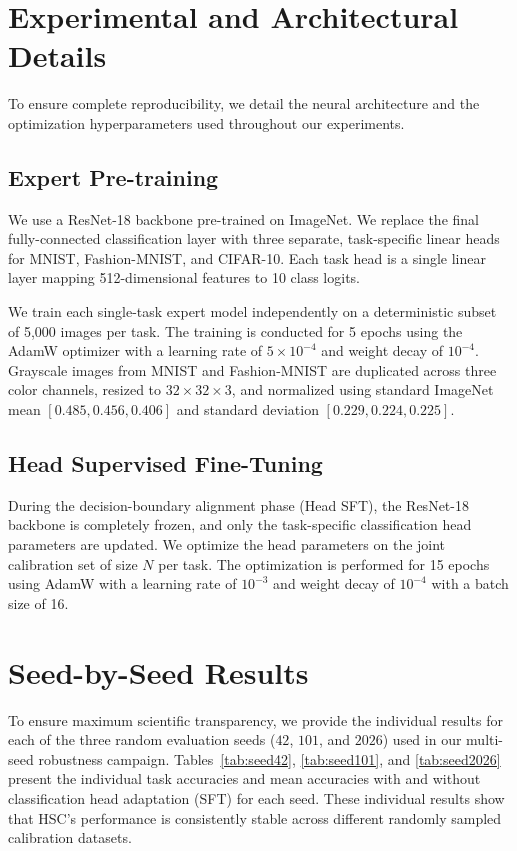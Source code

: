 \documentclass{article}
\begin{document}
\section{Experimental and Architectural Details}
\label{sec:appendix_setup}

To ensure complete reproducibility, we detail the neural architecture and the optimization hyperparameters used throughout our experiments.

\subsection{Expert Pre-training}
We use a ResNet-18 backbone pre-trained on ImageNet. We replace the final fully-connected classification layer with three separate, task-specific linear heads for MNIST, Fashion-MNIST, and CIFAR-10. Each task head is a single linear layer mapping 512-dimensional features to 10 class logits. 

We train each single-task expert model independently on a deterministic subset of 5,000 images per task. The training is conducted for 5 epochs using the AdamW optimizer with a learning rate of $5 \times 10^{-4}$ and weight decay of $10^{-4}$. Grayscale images from MNIST and Fashion-MNIST are duplicated across three color channels, resized to $32 \times 32 \times 3$, and normalized using standard ImageNet mean $[0.485, 0.456, 0.406]$ and standard deviation $[0.229, 0.224, 0.225]$. 

\subsection{Head Supervised Fine-Tuning}
During the decision-boundary alignment phase (Head SFT), the ResNet-18 backbone is completely frozen, and only the task-specific classification head parameters are updated. We optimize the head parameters on the joint calibration set of size $N$ per task. The optimization is performed for 15 epochs using AdamW with a learning rate of $10^{-3}$ and weight decay of $10^{-4}$ with a batch size of 16.

\section{Seed-by-Seed Results}
\label{sec:appendix_seeds}

To ensure maximum scientific transparency, we provide the individual results for each of the three random evaluation seeds ($42$, $101$, and $2026$) used in our multi-seed robustness campaign. Tables~\ref{tab:seed42}, \ref{tab:seed101}, and \ref{tab:seed2026} present the individual task accuracies and mean accuracies with and without classification head adaptation (SFT) for each seed. These individual results show that HSC's performance is consistently stable across different randomly sampled calibration datasets.
\end{document}
